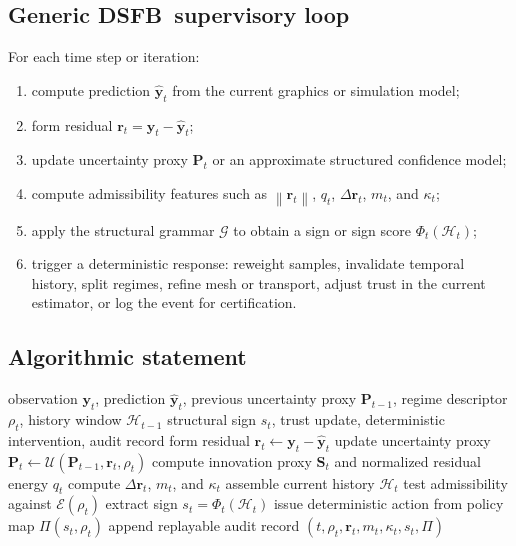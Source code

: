 \documentclass[11pt,letterpaper]{article}
\newcommand{\dsfb}{\textsc{DSFB}}
\newcommand{\admiss}{\mathcal{E}}
\newcommand{\grammar}{\mathcal{G}}
\newcommand{\histspace}{\mathcal{H}}
\newcommand{\obs}{\mathbf{y}}
\newcommand{\pred}{\hat{\mathbf{y}}}
\newcommand{\resid}{\mathbf{r}}
\newcommand{\covar}{\mathbf{P}}
\newcommand{\innov}{\mathbf{S}}
\newcommand{\metares}{m}
\newcommand{\norm}[1]{\left\lVert #1 \right\rVert}
\theoremstyle{gcresult}
\theoremstyle{definition}
\begin{document}
\subsection{Generic \dsfb\ supervisory loop}
For each time step or iteration:
\begin{enumerate}[leftmargin=2.2em]
    \item compute prediction $\pred_t$ from the current graphics or simulation model;
    \item form residual $\resid_t = \obs_t - \pred_t$;
    \item update uncertainty proxy $\covar_t$ or an approximate structured confidence model;
    \item compute admissibility features such as $\norm{\resid_t}$, $q_t$, $\Delta \resid_t$, $\metares_t$, and $\kappa_t$;
    \item apply the structural grammar $\grammar$ to obtain a sign or sign score $\Phi_t(\histspace_t)$;
    \item trigger a deterministic response: reweight samples, invalidate temporal history, split regimes, refine mesh or transport, adjust trust in the current estimator, or log the event for certification.
\end{enumerate}

\subsection{Algorithmic statement}
\begin{algorithm}[H]
\caption{One \dsfb\ supervisory step}
\label{alg:dsfb}
\begin{algorithmic}[1]
\Require observation $\obs_t$, prediction $\pred_t$, previous uncertainty proxy $\covar_{t-1}$, regime descriptor $\rho_t$, history window $\histspace_{t-1}$
\Ensure structural sign $s_t$, trust update, deterministic intervention, audit record
\State form residual $\resid_t \gets \obs_t - \pred_t$
\State update uncertainty proxy $\covar_t \gets \mathcal{U}(\covar_{t-1},\resid_t,\rho_t)$
\State compute innovation proxy $\innov_t$ and normalized residual energy $q_t$
\State compute $\Delta\resid_t$, $\metares_t$, and $\kappa_t$
\State assemble current history $\histspace_t$
\State test admissibility against $\admiss(\rho_t)$
\State extract sign $s_t = \Phi_t(\histspace_t)$
\State issue deterministic action from policy map $\Pi(s_t,\rho_t)$
\State append replayable audit record $(t,\rho_t,\resid_t,\metares_t,\kappa_t,s_t,\Pi)$
\end{algorithmic}
\end{algorithm}
\end{document}
